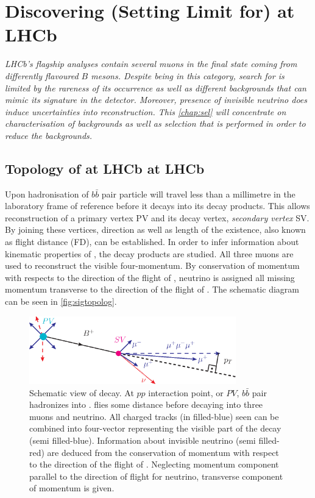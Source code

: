 \chapter{Discovering (Setting Limit for) \Bmumumu at LHCb}
\label{chap:sel}

\textit{LHCb's flagship analyses contain several muons in the final state coming from differently flavoured $B$ mesons. Despite being in this category, search for \Bmumumu is limited by the rareness of its occurrence as well as different backgrounds that can mimic its signature in the detector. Moreover, presence of invisible neutrino does induce uncertainties into reconstruction. This \autoref{chap:sel} will concentrate on characterisation of backgrounds as well as selection that is performed in order to reduce the backgrounds.}


\section{Topology of at LHCb \Bmumumu at LHCb}

Upon hadronisation of $b\bar{b}$ pair \Bpm particle will travel less than a millimetre in the laboratory frame of reference before it decays into its decay products. This allows reconstruction of a primary vertex \gls{PV} and its decay vertex, \textit{secondary vertex} \gls{SV}. By joining these vertices, direction as well as length of the \Bpm existence, also known as flight distance (\gls{FD}), can be established. In order to infer information about kinematic properties of \Bpm, the decay products are studied. All three muons are used to reconstruct the visible four-momentum. By conservation of momentum with respects to the direction of the flight of \Bpm, neutrino is assigned all missing momentum transverse to the direction of the flight of \Bpm. The schematic diagram can be seen in \autoref{fig:sigtopolog}.

\begin{figure}[!h]
	\centering
	\includegraphics[width = 0.8\textwidth]{figs/sel/DecReco_fin.eps}
	\caption{Schematic view of \Bmumumu decay. At $pp$ interaction point, or $PV$, $b\bar{b}$ pair hadronizes into \Bpm. \Bpm flies some distance before decaying into three muons and neutrino. All charged tracks (in filled-blue) seen can be combined into four-vector representing the visible part of the decay (semi filled-blue). Information about invisible neutrino (semi filled-red) are deduced from the conservation of momentum with respect to the direction of the flight of \Bpm. Neglecting momentum component parallel to the direction of flight for neutrino, transverse component of momentum is given.}
	\label{fig:sigtopolog}
\end{figure}

